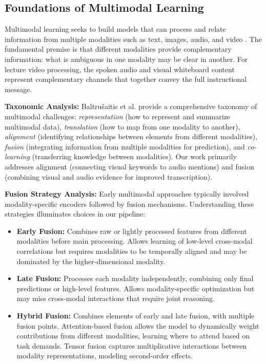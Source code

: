 \subsection{Foundations of Multimodal Learning}

Multimodal learning seeks to build models that can process and relate information from multiple modalities such as text, images, audio, and video \cite{Baltrusaitis2019}. The fundamental premise is that different modalities provide complementary information: what is ambiguous in one modality may be clear in another. For lecture video processing, the spoken audio and visual whiteboard content represent complementary channels that together convey the full instructional message.

\textbf{Taxonomic Analysis:} Baltru{\v{s}}aitis et al. \cite{Baltrusaitis2019} provide a comprehensive taxonomy of multimodal challenges: \textit{representation} (how to represent and summarize multimodal data), \textit{translation} (how to map from one modality to another), \textit{alignment} (identifying relationships between elements from different modalities), \textit{fusion} (integrating information from multiple modalities for prediction), and \textit{co-learning} (transferring knowledge between modalities). Our work primarily addresses alignment (connecting visual keywords to audio mentions) and fusion (combining visual and audio evidence for improved transcription).

\textbf{Fusion Strategy Analysis:} Early multimodal approaches typically involved modality-specific encoders followed by fusion mechanisms. Understanding these strategies illuminates choices in our pipeline:

\begin{itemize}
    \item \textbf{Early Fusion:} Combines raw or lightly processed features from different modalities before main processing. Allows learning of low-level cross-modal correlations but requires modalities to be temporally aligned and may be dominated by the higher-dimensional modality.
    
    \item \textbf{Late Fusion:} Processes each modality independently, combining only final predictions or high-level features. Allows modality-specific optimization but may miss cross-modal interactions that require joint reasoning.
    
    \item \textbf{Hybrid Fusion:} Combines elements of early and late fusion, with multiple fusion points. Attention-based fusion \cite{Xu2015} allows the model to dynamically weight contributions from different modalities, learning where to attend based on task demands. Tensor fusion \cite{Zadeh2017} captures multiplicative interactions between modality representations, modeling second-order effects.
\end{itemize}

